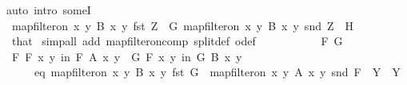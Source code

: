 \begin{isabellebody}
{\isacharparenleft}{\kern0pt}auto\ intro{\isacharcolon}{\kern0pt}\ someI{}{\isacharparenright}{\kern0pt}\isanewline
\ \ \ \ \ \ \isamarkupfalse%
\ {\isachardoublequoteopen}map{\isacharunderscore}{\kern0pt}filter{\isacharunderscore}{\kern0pt}on\ {\isacharbraceleft}{\kern0pt}{\isacharparenleft}{\kern0pt}x{\isacharcomma}{\kern0pt}\ y{\isacharparenright}{\kern0pt}{\isachardot}{\kern0pt}\ B\ x\ y{\isacharbraceright}{\kern0pt}\ fst\ {\isacharquery}{\kern0pt}Z\ {\isacharequal}{\kern0pt}\ {\isacharquery}{\kern0pt}G{\isachardoublequoteclose}\ {\isachardoublequoteopen}map{\isacharunderscore}{\kern0pt}filter{\isacharunderscore}{\kern0pt}on\ {\isacharbraceleft}{\kern0pt}{\isacharparenleft}{\kern0pt}x{\isacharcomma}{\kern0pt}\ y{\isacharparenright}{\kern0pt}{\isachardot}{\kern0pt}\ B\ x\ y{\isacharbraceright}{\kern0pt}\ snd\ {\isacharquery}{\kern0pt}Z\ {\isacharequal}{\kern0pt}\ {\isacharquery}{\kern0pt}H{\isachardoublequoteclose}\isanewline
\ \ \ \ \ \ \ \ \isamarkupfalse%
\ that\ \isamarkupfalse%
{\isacharparenleft}{\kern0pt}simp{\isacharunderscore}{\kern0pt}all\ add{\isacharcolon}{\kern0pt}\ map{\isacharunderscore}{\kern0pt}filter{\isacharunderscore}{\kern0pt}on{\isacharunderscore}{\kern0pt}comp\ split{\isacharunderscore}{\kern0pt}def\ o{\isacharunderscore}{\kern0pt}def{\isacharparenright}{\kern0pt}\isanewline
\ \ \ \ \isamarkupfalse%
\isanewline
\ \ \isamarkupfalse%
\isanewline
\isanewline
\ \ \isamarkupfalse%
\ F\ G\isanewline
\ \ \isamarkupfalse%
\ F{\isacharcolon}{\kern0pt}\ {\isachardoublequoteopen}{\isasymforall}\isactrlsub F\ {\isacharparenleft}{\kern0pt}x{\isacharcomma}{\kern0pt}\ y{\isacharparenright}{\kern0pt}\ in\ F{\isachardot}{\kern0pt}\ A\ x\ y{\isachardoublequoteclose}\ \ G{\isacharcolon}{\kern0pt}\ {\isachardoublequoteopen}{\isasymforall}\isactrlsub F\ {\isacharparenleft}{\kern0pt}x{\isacharcomma}{\kern0pt}\ y{\isacharparenright}{\kern0pt}\ in\ G{\isachardot}{\kern0pt}\ B\ x\ y{\isachardoublequoteclose}\isanewline
\ \ \ \ \ eq{\isacharcolon}{\kern0pt}\ {\isachardoublequoteopen}map{\isacharunderscore}{\kern0pt}filter{\isacharunderscore}{\kern0pt}on\ {\isacharbraceleft}{\kern0pt}{\isacharparenleft}{\kern0pt}x{\isacharcomma}{\kern0pt}\ y{\isacharparenright}{\kern0pt}{\isachardot}{\kern0pt}\ B\ x\ y{\isacharbraceright}{\kern0pt}\ fst\ G\ {\isacharequal}{\kern0pt}\ map{\isacharunderscore}{\kern0pt}filter{\isacharunderscore}{\kern0pt}on\ {\isacharbraceleft}{\kern0pt}{\isacharparenleft}{\kern0pt}x{\isacharcomma}{\kern0pt}\ y{\isacharparenright}{\kern0pt}{\isachardot}{\kern0pt}\ A\ x\ y{\isacharbraceright}{\kern0pt}\ snd\ F{\isachardoublequoteclose}\ {\isacharparenleft}{\kern0pt}\ {\isachardoublequoteopen}{\isacharquery}{\kern0pt}Y{}\ {\isacharequal}{\kern0pt}\ {\isacharquery}{\kern0pt}Y{}{\isachardoublequoteclose}{\isacharparenright}{\kern0pt}\isanewline

\end{isabellebody}
